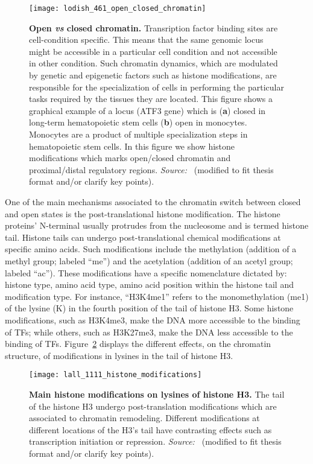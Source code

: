 \begin{figure}[h!]
\centering
\texttt{[image: lodish\_461\_open\_closed\_chromatin]}
\caption[Open \emph{vs} closed chromatin]{\textbf{Open \emph{vs} closed chromatin.} Transription factor binding sites are cell-condition specific. This means that the same genomic locus might be accessible in a particular cell condition and not accessible in other condition. Such chromatin dynamics, which are modulated by genetic and epigenetic factors such as histone modifications, are responsible for the specialization of cells in performing the particular tasks required by the tissues they are located. This figure shows a graphical example of a locus (ATF3 gene) which is (\textbf{a}) closed in long-term hematopoietic stem cells (\textbf{b}) open in monocytes. Monocytes are a product of multiple specialization steps in hematopoietic stem cells. In this figure we show histone modifications which marks open/closed chromatin and proximal/distal regulatory regions. \emph{Source:~\cite{lodish2007}} (modified to fit thesis format and/or clarify key points).}
\label{fig:lodish_open_closed_chromatin}
\end{figure}

One of the main mechanisms associated to the chromatin switch between closed and open states is the post-translational histone modification. The histone proteins' N-terminal usually protrudes from the nucleosome and is termed histone tail. Histone tails can undergo post-translational chemical modifications at specific amino acids. Such modifications include the methylation (addition of a methyl group; labeled ``me'') and the acetylation (addition of an acetyl group; labeled ``ac''). These modifications have a specific nomenclature dictated by: histone type, amino acid type, amino acid position within the histone tail and modification type. For instance, ``H3K4me1'' refers to the monomethylation (me1) of the lysine (K) in the fourth position of the tail of histone H3. Some histone modifications, such as H3K4me3, make the DNA more accessible to the binding of TFs; while others, such as H3K27me3, make the DNA less accessible to the binding of TFs. Figure~\ref{fig:lall_histone_modifications} displays the different effects, on the chromatin structure, of modifications in lysines in the tail of histone H3.

\begin{figure}[h!]
\centering
\texttt{[image: lall\_1111\_histone\_modifications]}
\caption[Main histone modifications on lysines of histone H3]{\textbf{Main histone modifications on lysines of histone H3.} The tail of the histone H3 undergo post-translation modifications which are associated to chromatin remodeling. Different modifications at different locations of the H3's tail have contrasting effects such as transcription initiation or repression. \emph{Source:~\cite{lall2007}} (modified to fit thesis format and/or clarify key points).}
\label{fig:lall_histone_modifications}
\end{figure}


